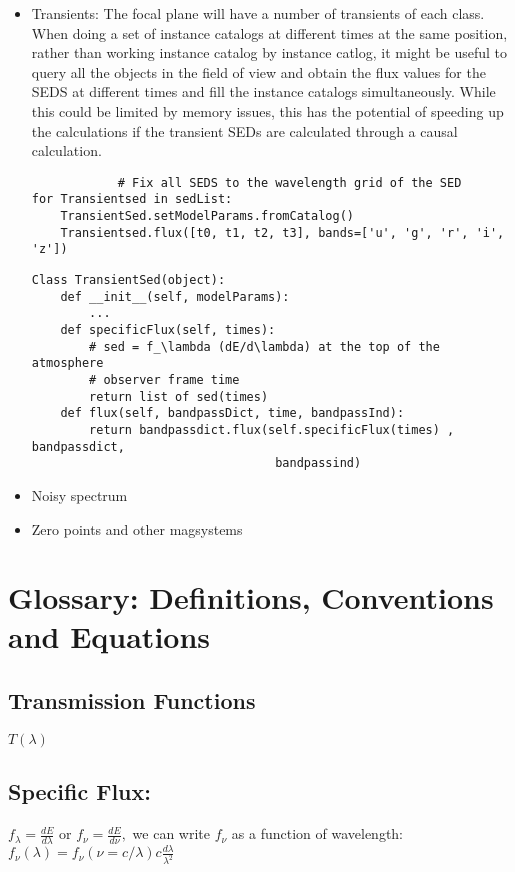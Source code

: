 \documentclass{article}[12pt]
\begin{document}
\begin{itemize}
\begin{verbatim}
                                                             ['u', 'g', 'r', 'i', 'z']])
    \end{verbatim}
    \item Transients: The focal plane will have a number of transients of each class. When doing a set of instance catalogs at different times at the same position, rather than working instance catalog by instance catlog, it might be useful to query all the objects in the field of view and obtain the flux values for the SEDS at different times and fill the instance catalogs simultaneously. While this could be limited by memory issues, this has the potential of speeding up the calculations if the transient SEDs are calculated through a causal calculation.
        \begin{verbatim}
            # Fix all SEDS to the wavelength grid of the SED
for Transientsed in sedList:
    TransientSed.setModelParams.fromCatalog()
    Transientsed.flux([t0, t1, t2, t3], bands=['u', 'g', 'r', 'i', 'z'])
        \end{verbatim}
        \begin{verbatim}
Class TransientSed(object):
    def __init__(self, modelParams):
        ...
    def specificFlux(self, times):
        # sed = f_\lambda (dE/d\lambda) at the top of the atmosphere
        # observer frame time
        return list of sed(times)
    def flux(self, bandpassDict, time, bandpassInd):
        return bandpassdict.flux(self.specificFlux(times) , bandpassdict,
                                  bandpassind)
        \end{verbatim}

    \item Noisy spectrum 
    \item Zero points and other magsystems 
\end{itemize}

\section{Glossary: Definitions, Conventions and Equations}

\subsection{Transmission Functions} $T(\lambda)$ 

\subsection{Specific Flux:} $f_{\lambda} = \frac{dE}{d\lambda}$ or 
$f_{\nu} = \frac{dE}{d\nu},$ we can write $f_\nu$ as a function of wavelength:
$f_\nu(\lambda) = f_{\nu}(\nu=c/\lambda) c \frac{d\lambda}{\lambda^2}$
\end{document}
